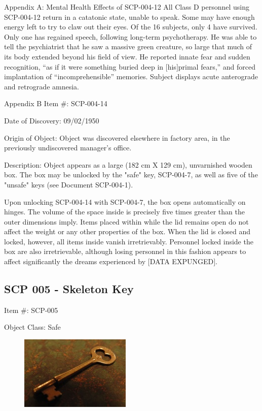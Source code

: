 \documentclass[a4paper, 11pt]{article}
\newcommand{\lb}{\ensuremath{[}}
\newcommand{\rb}{\ensuremath{]}}
\newcommand{\expunged}{\lb DATA EXPUNGED\rb}
\begin{document}
Appendix A: Mental Health Effects of SCP-004-12
All Class D personnel using SCP-004-12 return in a catatonic state, unable to speak. Some may have enough energy left to try to claw out their eyes. Of the 16 subjects, only 4 have survived. Only one has regained speech, following long-term psychotherapy. He was able to tell the psychiatrist that he saw a massive green creature, so large that much of its body extended beyond his field of view. He reported innate fear and sudden recognition, “as if it were something buried deep in \lb his\rb primal fears,” and forced implantation of “incomprehensible” memories. Subject displays acute anterograde and retrograde amnesia.

Appendix B
Item #: SCP-004-14

Date of Discovery: 09/02/1950

Origin of Object: Object was discovered elsewhere in factory area, in the previously undiscovered manager's office.

Description: Object appears as a large (182 cm X 129 cm), unvarnished wooden box. The box may be unlocked by the "safe" key, SCP-004-7, as well as five of the "unsafe" keys (see Document SCP-004-1).

Upon unlocking SCP-004-14 with SCP-004-7, the box opens automatically on hinges. The volume of the space inside is precisely five times greater than the outer dimensions imply. Items placed within while the lid remains open do not affect the weight or any other properties of the box. When the lid is closed and locked, however, all items inside vanish irretrievably. Personnel locked inside the box are also irretrievable, although losing personnel in this fashion appears to affect significantly the dreams experienced by \expunged.

\newpage
\subsection{SCP 005 - Skeleton Key}
Item \#: SCP-005

Object Class: Safe

\begin{figure}
\includegraphics[scale=1]{img/scp/005.jpg}
\end{figure}
\end{document}
